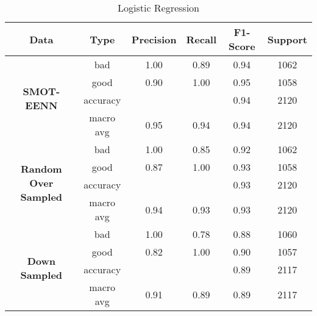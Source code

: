 \documentclass[conference]{IEEEtran}
\begin{document}
    \begin{table}[!t]
        \renewcommand{\arraystretch}{1.25}
        \caption{Logistic Regression}
        \label{table:regression}
        \centering
        \begin{tabular}{ |c|c|c|c|c|c| }
            \hline
                \textbf{Data} & \textbf{Type} & \textbf{Precision} & \textbf{Recall} & \textbf{F1-Score} & \textbf{Support} \\
            \hline
                \multirow{4}{1.1cm}{\centering \textbf{SMOT-EENN}} & bad & 1.00 & 0.89 & 0.94 & 1062 \\
            \cline{2-6}
                 & good & 0.90 & 1.00 & 0.95 & 1058\\
            \cline{2-6}
                 & accuracy &  &  & 0.94 & 2120 \\
            \cline{2-6}
                 & macro avg & 0.95 & 0.94 & 0.94 & 2120 \\
            \hline
                \multirow{4}{1.1cm}{\centering \textbf{Random Over Sampled}} & bad & 1.00 & 0.85 & 0.92 & 1062 \\
            \cline{2-6}
                 & good & 0.87 & 1.00 & 0.93 & 1058 \\
            \cline{2-6}
                 & accuracy &  &  & 0.93 & 2120 \\
            \cline{2-6}
                 & macro avg & 0.94 & 0.93 & 0.93 & 2120 \\
            \hline
                \multirow{4}{1.1cm}{\centering \textbf{ \textbf{Down Sampled}}} & bad & 1.00 & 0.78 & 0.88 & 1060 \\
            \cline{2-6}
                 & good & 0.82 & 1.00 & 0.90 & 1057 \\
            \cline{2-6}
                 & accuracy &  &  & 0.89 & 2117 \\
            \cline{2-6}
                 & macro avg & 0.91 & 0.89 & 0.89 & 2117 \\
            \hline
        \end{tabular}
    \end{table}
\end{document}
